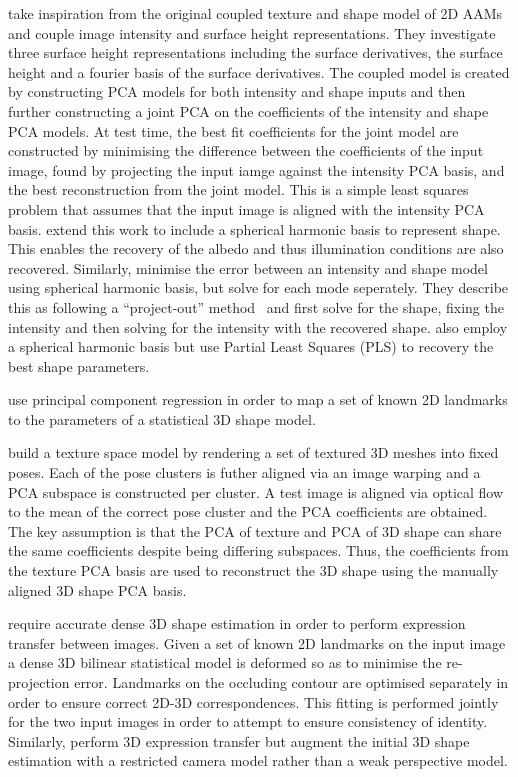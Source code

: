 \citet{castelan2007coupled} take inspiration from the original coupled 
texture and shape model of 2D AAMs~\cite{cootes2001active} and couple image
intensity and surface height representations. They investigate three surface
height representations including the surface derivatives, the surface height
and a fourier basis of the surface derivatives. The coupled model is created
by constructing PCA models for both intensity and shape inputs and then
further constructing a joint PCA on the coefficients of the intensity and shape
PCA models. At test time, the best fit coefficients for the joint model are
constructed by minimising the difference between the coefficients of
the input image, found by projecting the input iamge against the intensity PCA
basis, and the best reconstruction from the joint model. This is a simple
least squares problem that assumes that the input image is aligned
with the intensity PCA basis. \citet{ahmed2007new} extend this work to
include a spherical harmonic basis to represent shape. This enables
the recovery of the albedo and thus illumination conditions are also
recovered. Similarly, \citet{rara2009model} minimise the error between
an intensity and shape model using spherical harmonic basis, but solve for 
each mode seperately. They describe this as following a ``project-out'' 
method~\cite{matthews2004active} and first solve for the shape, fixing the 
intensity and then solving for the intensity with the recovered shape. 
\citet{rara2010face} also employ a spherical harmonic basis but use
Partial Least Squares (PLS) to recovery the best shape parameters.

\citet{rara2011model} use principal component regression in order to map
a set of known 2D landmarks to the parameters of a statistical 3D shape model.

\citet{kouzani1998example} build a texture space model by rendering a set of
textured 3D meshes into fixed poses. Each of the pose clusters is futher aligned
via an image warping and a PCA subspace is constructed per cluster. A test image
is aligned via optical flow to the mean of the correct pose cluster and the PCA
coefficients are obtained. The key assumption is that the PCA of texture and PCA
of 3D shape can share the same coefficients despite being differing subspaces.
Thus, the coefficients from the texture PCA basis are used to reconstruct the 3D
shape using the manually aligned 3D shape PCA basis.

\citet{Yang:2011gj} require accurate dense 3D shape estimation in order to
perform expression transfer between images. Given a set of known 2D landmarks on
the input image a dense 3D bilinear statistical model is deformed so as to
minimise the re-projection error. Landmarks on the occluding contour are
optimised separately in order to ensure correct 2D-3D correspondences. This
fitting is performed jointly for the two input images in order to attempt to
ensure consistency of identity.
Similarly, \citet{yang2012face} perform 3D expression transfer
but augment the initial 3D shape estimation with a restricted camera model
rather than a weak perspective model.

